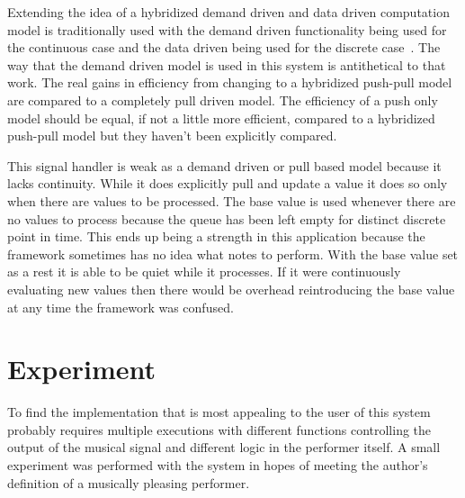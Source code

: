 \documentclass[12pt]{ucthesis}
\begin{document}
{Extending the idea of a hybridized demand driven and data driven computation model is traditionally used with the demand driven functionality being used for the continuous case and the data driven being used for the discrete case~\cite{push-pull-frp}. The way that the demand driven model is used in this system is antithetical to that work. The real gains in efficiency from changing to a hybridized push-pull model are compared to a completely pull driven model. The efficiency of a push only model should be equal, if not a little more efficient, compared to a hybridized push-pull model but they haven't been explicitly compared.  

This signal handler is weak as a demand driven or pull based model because it lacks continuity. While it does explicitly pull and update a value it does so only when there are values to be processed. The base value is used whenever there are no values to process because the queue has been left empty for distinct discrete point in time. This ends up being a strength in this application because the framework sometimes has no idea what notes to perform. With the base value set as a rest it is able to be quiet while it processes. If it were continuously evaluating new values then there would be overhead reintroducing the base value at any time the framework was confused. 


\chapter{Experiment}
\label {experiment}
To find the implementation that is most appealing to the user of this system probably requires multiple executions with different functions controlling the output of the musical signal and different logic in the performer itself. A small experiment was performed with the system in hopes of meeting the author's definition of a musically pleasing performer. 

}
\end{document}
